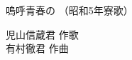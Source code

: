 \documentclass[10pt,b5j]{tarticle} %
\begin{document}
\begin{minipage}[c]{0.7\hsize} %
    \begin{center}
        {\LARGE
            嗚呼青春の %
        }
        {\small 
            （昭和5年寮歌） %
        }
    \end{center}
\end{minipage}
\begin{minipage}[c]{0.3\hsize} %
    \begin{flushright} %
        児山信蔵君 作歌\\有村徹君 作曲 %
    \end{flushright}
\end{minipage}
\end{document}
